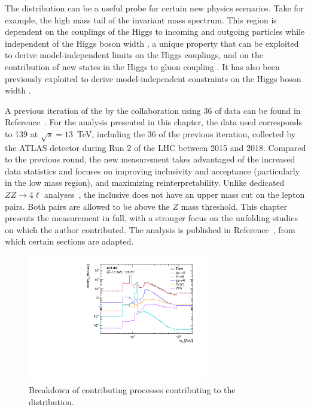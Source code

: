 The \mFourL{} distribution can be a useful probe for certain new physics scenarios. Take for example, the high mass tail of the invariant mass spectrum. This region is dependent on the couplings of the Higgs to incoming and outgoing particles while independent of the Higgs boson width \cite{Campbell_2016}, a unique property that can be exploited to derive model-independent limits on the Higgs couplings, and on the  contribution of new states in the Higgs to gluon coupling \cite{Cacciapaglia_2014}. It has also been previously exploited to derive model-independent constraints on the Higgs boson width \cite{Caola_2013}. 

A previous iteration of the \mFourL{} by the \ATLAS collaboration using \unit{36}{\invfb} of data can be found in Reference~\cite{Aaboud:2019lxo}. For the analysis presented in this chapter, the data used corresponds to \unit{139}{\invfb} at $\sqrt{s}=13$~TeV, including the \unit{36}{\invfb} of the previous iteration, collected by the ATLAS detector during Run 2 of the LHC between 2015 and 2018. Compared to the previous round, the new \mFourL{} measurement takes advantaged of the increased data statistics and focuses on improving inclusivity and acceptance (particularly in the low mass region), and maximizing reinterpretability. Unlike dedicated $ZZ\rightarrow 4\ell$ analyses~\cite{Sirunyan:s10052-018-5567-9,Aaboud:97.032005}, the inclusive \mFourL{} does not have an upper mass cut on the lepton pairs. Both pairs are allowed to be above the $Z$ mass threshold. This chapter presents the measurement in full, with a stronger focus on the unfolding studies on which the author contributed. The analysis is published in Reference~\cite{m4l2021_paper}, from which certain sections are adapted.

\begin{figure}
    \centering
    \includegraphics[width=0.7\textwidth]{Figures/m4l/processbreakdown.pdf}
    \caption{Breakdown of contributing processes contributing to the \mFourL{} distribution.}
    \label{fig:m4lbreakdown}
\end{figure}

